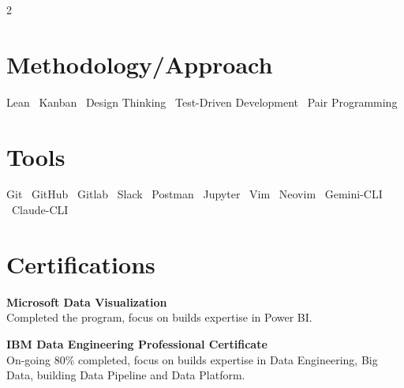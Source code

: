 \documentclass[11pt,a4paper]{article}
\begin{document}
\begin{paracol}{2}
  \section{Methodology/Approach}

  \small Lean \textbullet\ Kanban \textbullet\ Design Thinking \textbullet\ Test-Driven Development \textbullet\ Pair Programming

  \section{Tools}

  \small Git \textbullet\ GitHub \textbullet\ Gitlab \textbullet\ Slack \textbullet\ Postman \textbullet\ Jupyter \textbullet\ Vim \textbullet\ Neovim \textbullet\ Gemini-CLI \textbullet\ Claude-CLI

  \section{Certifications}
  \textbf{Microsoft Data Visualization}\\
  Completed the program, focus on builds expertise in Power BI.

  \vspace{8pt}
  \textbf{IBM Data Engineering Professional Certificate}\\
  On-going 80\% completed, focus on builds expertise in Data Engineering, Big Data, building Data Pipeline and Data Platform.
\end{paracol}
\end{document}
